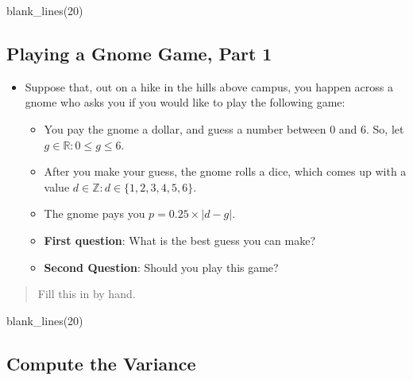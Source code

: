 \documentclass[
]{book}
\newenvironment{Shaded}{\begin{snugshade}}{\end{snugshade}}
\newcommand{\DecValTok}[1]{\textcolor[rgb]{0.00,0.00,0.81}{#1}}
\newcommand{\FunctionTok}[1]{\textcolor[rgb]{0.00,0.00,0.00}{#1}}
\newcommand{\NormalTok}[1]{#1}
\providecommand{\tightlist}{%
  \setlength{\itemsep}{0pt}\setlength{\parskip}{0pt}}
\theoremstyle{definition}
\theoremstyle{definition}
\theoremstyle{definition}
\theoremstyle{definition}
\theoremstyle{remark}
\begin{document}
\begin{Shaded}
\begin{Highlighting}[]
\FunctionTok{blank\_lines}\NormalTok{(}\DecValTok{20}\NormalTok{)}
\end{Highlighting}
\end{Shaded}

\vspace{20cm}

\hypertarget{playing-a-gnome-game-part-1}{%
\subsection{Playing a Gnome Game, Part 1}\label{playing-a-gnome-game-part-1}}

\begin{itemize}
\tightlist
\item
  Suppose that, out on a hike in the hills above campus, you happen across a gnome who asks you if you would like to play the following game:

  \begin{itemize}
  \tightlist
  \item
    You pay the gnome a dollar, and guess a number between 0 and 6. So, let \(g \in \mathbb{R}: 0 \leq g \leq 6\).
  \item
    After you make your guess, the gnome rolls a dice, which comes up with a value \(d \in \mathbb{Z}: d \in \{1,2,3,4,5,6\}\).
  \item
    The gnome pays you \(p = 0.25 \times |d - g|\).
  \item
    \textbf{First question}: What is the best guess you can make?
  \item
    \textbf{Second Question}: Should you play this game?
  \end{itemize}
\end{itemize}

\begin{quote}
Fill this in by hand.
\end{quote}

\begin{Shaded}
\begin{Highlighting}[]
\FunctionTok{blank\_lines}\NormalTok{(}\DecValTok{20}\NormalTok{)}
\end{Highlighting}
\end{Shaded}

\vspace{20cm}

\hypertarget{compute-the-variance}{%
\subsection{Compute the Variance}\label{compute-the-variance}}
\end{document}
